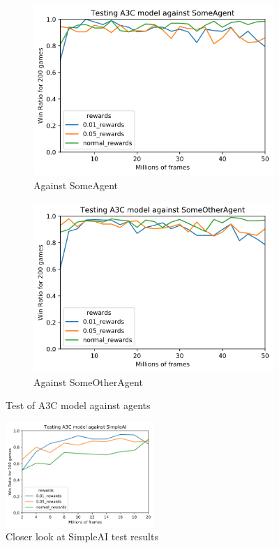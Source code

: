 \begin{figure}[th!]
    \begin{subfigure}{0.49\textwidth}
        \centering
        \includegraphics[width=\textwidth]{figures/a3c-test-someagent.png}
        \caption{Against SomeAgent}
        \label{fig:test-a3c-someagent}
    \end{subfigure}
    \begin{subfigure}{0.49\textwidth}
        \centering
        \includegraphics[width=\textwidth]{figures/a3c-test-someaothergent.png}
        \caption{Against SomeOtherAgent}
        \label{fig:test-a3c-someotheragent}
    \end{subfigure}
    
    \caption{Test of A3C model against agents}
    \label{fig:a3c-testing}
\end{figure}

\begin{figure}[ht!]
    \centering
    \includegraphics[width=0.5\textwidth]{figures/a3c-test-simpleai-close.png}
    \caption{Closer look at SimpleAI test results}
    \label{fig-a3c-testing-simpleai-closer}
\end{figure}